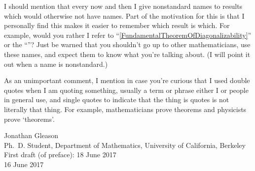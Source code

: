 I should mention that every now and then I give nonstandard names to results which would otherwise not have names.  Part of the motivation for this is that I personally find this makes it easier to remember which result is which.  For example, would you rather I refer to ``\cref{FundamentalTheoremOfDiagonalizability}'' or the ``''?  Just be warned that you shouldn't go up to other mathematicians, use these names, and expect them to know what you're talking about.  (I will point it out when a name is nonstandard.)

As an unimportant comment, I mention in case you're curious that I used double quotes when I am quoting something, usually a term or phrase either I or people in general use, and single quotes to indicate that the thing is quotes is not literally that thing.  For example, mathematicians prove theorems and physicists prove `theorems'.

\blankline
\horizontalrule
\blankline

\hfill Jonathan Gleason \\
\hfill Ph.~D. Student, Department of Mathematics, University of California, Berkeley \\
\hfill First draft (of preface):  18 June 2017 \\
\hfill 16 June 2017

